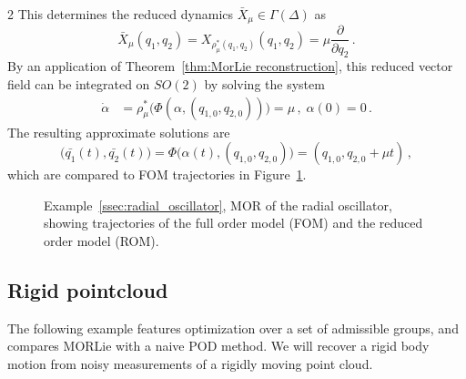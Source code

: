 \documentclass{article}
\newcommand{\R}{\mathbb{R}}                                 %
\newcommand{\appX}{\bar{X}}
\newcommand{\der}[2][3]{\frac{\partial{#1}}{\partial{#2}}}
\begin{document}
\begin{multicols}{2}
This determines the reduced dynamics $\appX_\mu \in \Gamma(\Delta)$ as
\begin{equation}
    \appX_\mu(q_1,q_2) = X_{\rho_\mu^*(q_1,q_2)}(q_1,q_2) =  \mu\der[]{q_2}\,.
\end{equation}
By an application of Theorem~\ref{thm:MorLie reconstruction}, this reduced vector field can be integrated on $SO(2)$ by solving the system
\begin{align}
    \dot{\alpha} &= \rho_\mu^*\big(\Phi(\alpha, (q_{1,0},q_{2,0}))\big) = \mu \,,\; \alpha(0) = 0\,. 
\end{align}
The resulting approximate solutions are 
\begin{equation}
    \big(\bar{q_1}(t), \bar{q_2}(t)\big) = \Phi\big(\alpha(t),(q_{1,0},q_{2,0})\big) =  (q_{1,0},q_{2,0}+\mu t)\,,
\end{equation}
which %
are compared to FOM trajectories in Figure~\ref{fig:radial_oscillator}.
\begin{figure}[H]
    \centering
    \def\svgwidth{0.9\columnwidth}\scriptsize
    \caption{Example~\ref{ssec:radial_oscillator}, MOR of the radial oscillator, showing trajectories of the full order model (FOM) and the reduced order model (ROM).}\label{fig:radial_oscillator}
\end{figure}

\subsection{Rigid pointcloud}\label{ssec:rigid-pointcloud}
The following example features optimization over a set of admissible groups, and compares MORLie with a naive POD method. 
%
We will recover a rigid body motion %
from noisy measurements of a rigidly moving point cloud. %
%


\end{multicols}
\end{document}
